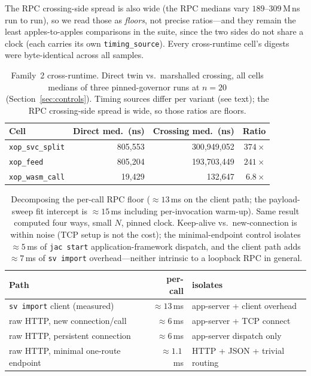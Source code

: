 \documentclass[conference]{IEEEtran}
\newcommand{\code}[1]{\texttt{#1}}
\begin{document}
The RPC crossing-side spread is also wide (the RPC medians vary $189$--$309$\,M\,ns
run to run), so we read those as \emph{floors}, not precise ratios---and they
remain the least apples-to-apples comparisons in the suite, since the two sides
do not share a clock (each carries its own \code{timing\_source}). Every
cross-runtime cell's digests were byte-identical across all samples.

\begin{table}[t]
\caption{Family~2 cross-runtime. Direct twin vs.\ marshalled crossing, all cells
medians of three pinned-governor runs at $n{=}20$ (Section~\ref{sec:controls}).
Timing sources differ per variant (see text); the RPC crossing-side spread is
wide, so those ratios are floors.}
\label{tab:xruntime}
\centering
\small
\begin{tabular}{@{}lrrr@{}}
\toprule
Cell & Direct med.\ (ns) & Crossing med.\ (ns) & Ratio \\
\midrule
\code{xop\_svc\_split} & 805{,}553 & 300{,}949{,}052 & $374\times$ \\
\code{xop\_feed}      & 805{,}204 & 193{,}703{,}449 & $241\times$ \\
\code{xop\_wasm\_call} & 19{,}429  & 132{,}647       & $6.8\times$ \\
\bottomrule
\end{tabular}
\end{table}

\begin{table}[t]
\caption{Decomposing the per-call RPC floor ($\approx$$13$\,ms on the client
path; the payload-sweep fit intercept is $\approx$$15$\,ms including per-invocation
warm-up). Same result computed four ways, small $N$, pinned clock. Keep-alive
vs.\ new-connection is within noise (TCP setup is not the cost); the
minimal-endpoint control isolates $\approx$$5$\,ms of \code{jac start}
application-framework dispatch, and the client path adds $\approx$$7$\,ms of
\code{sv~import} overhead---neither intrinsic to a loopback RPC in general.}
\label{tab:rpcfloor}
\centering
\small
\begin{tabular}{@{}lrl@{}}
\toprule
Path & per-call & isolates \\
\midrule
\code{sv~import} client (measured)   & $\approx$$13$\,ms  & app-server + client overhead \\
raw HTTP, new connection/call        & $\approx$$6$\,ms   & app-server + TCP connect \\
raw HTTP, persistent connection      & $\approx$$6$\,ms   & app-server dispatch only \\
raw HTTP, minimal one-route endpoint & $\approx$$1.1$\,ms & HTTP + JSON + trivial routing \\
\bottomrule
\end{tabular}
\end{table}
\end{document}
